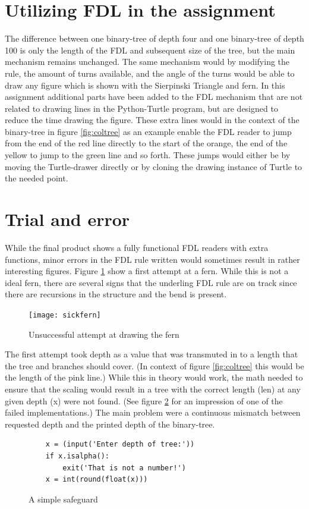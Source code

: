 \documentclass[titlepage]{article}
\begin{document}
\section{Utilizing FDL in the assignment}
The difference between one binary-tree of depth four and one binary-tree of depth 100 is only the length of the FDL and subsequent size of the tree, but the main mechanism remains unchanged.  The same mechanism would by modifying the rule, the amount of turns available, and the angle of the turns would be able to draw any figure which is shown with the Sierpinski Triangle and fern.  In this assignment additional parts have been added to the FDL mechanism that are not related to drawing lines in the Python-Turtle program, but are designed to reduce the time drawing the figure. These extra lines would in the context of the binary-tree in figure \ref{fig:coltree}  as an example enable the FDL reader to jump from the end of the red line directly to the start of the orange, the end of the yellow to jump to the green line and so forth. These jumps would either be by moving the Turtle-drawer directly or by cloning the drawing instance of Turtle to the needed point. 

\section{Trial and error}
While the final product shows a fully functional FDL readers with extra functions, minor errors in the FDL rule written would sometimes result in rather interesting figures. Figure \ref{fig:sickfern}  show a first attempt at a fern. While this is not a ideal fern, there are several signs that the underling FDL rule are on track since there are recursions in the structure and the bend is present. \par
\begin{figure}[H]
  \centering
  \texttt{[image: sickfern]}
  \caption{Unsuccessful attempt at drawing the fern}
  \label{fig:sickfern}
\end{figure}

The first attempt took depth as a value that was transmuted in to a length that the tree and branches should cover. (In context of figure \ref{fig:coltree}  this would be the length of the pink line.) 
While this in theory would work, the math needed to ensure that the scaling would result in a tree with the correct length (len) at any given depth (x) were not found. (See figure \ref{fig:bitreesafe}  for an impression of one of the failed implementations.) The main problem were a continuous mismatch between requested depth and the printed depth of the binary-tree. \par
\begin{figure}[H]
  \centering
  \begin{verbatim}
    x = (input('Enter depth of tree:'))
    if x.isalpha():
        exit('That is not a number!')
    x = int(round(float(x)))
  \end{verbatim}
  \caption{A simple safeguard}
  \label{fig:bitreesafe}
\end{figure}
\end{document}
